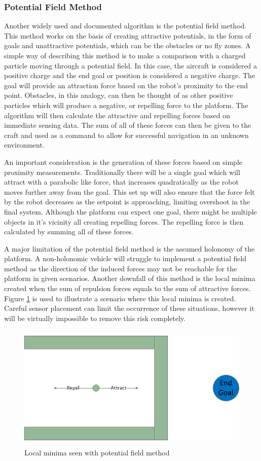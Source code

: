 		\subsubsection{Potential Field Method}\label{SSECT_PotentialField}
		Another widely used and documented algorithm is the potential field method. This method works on the basis of creating attractive potentials, in the form of goals and unattractive potentials, which can be the obstacles or no fly zones. A simple way of describing this method is to make a comparison with a charged particle moving through a potential field. In this case, the aircraft is considered a positive charge and the end goal or position is considered a negative charge. The goal will provide an attraction force based on the robot's proximity to the end point. Obstacles, in this analogy, can then be thought of as other positive particles which will produce a negative, or repelling force to the platform. The algorithm will then calculate the attractive and repelling forces based on immediate sensing data. The sum of all of these forces can then be given to the craft and used as a command to allow for successful navigation in an unknown environment.
		
		An important consideration is the generation of these forces based on simple proximity measurements. Traditionally there will be a single goal which will attract with a parabolic like force, that increases quadratically as the robot moves further away from the goal. This set up will also ensure that the force felt by the robot decreases as the setpoint is approaching, limiting overshoot in the final system. Although the platform can expect one goal, there might be multiple objects in it's vicinity all creating repelling forces. The repelling force is then calculated by summing all of these forces.
		
		A major limitation of the potential field method is the assumed holonomy of the platform. A non-holonomic vehicle will struggle to implement a potential field method as the direction of the induced forces may not be reachable for the platform in given scenarios. Another downfall of this method is the local minima created when the sum of repulsion forces equals to the sum of attractive forces. Figure \ref{IM_LocalMinima} is used to illustrate a scenario where this local minima is created. Careful sensor placement can limit the occurrence of these situations, however it will be virtually impossible to remove this risk completely.
		
		\begin{figure}[H]
			\centering
			\includegraphics[height = 6cm]{../References/Diagrams/LocalMinima}     
			\caption{Local minima seen with potential field method}
			\label{IM_LocalMinima}
		\end{figure}
		
	
	
	
